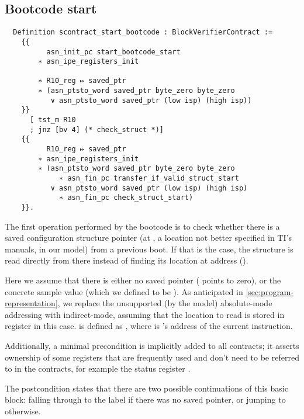 \subsection{Bootcode start}

\begin{verbatim}
  Definition scontract_start_bootcode : BlockVerifierContract :=
    {{
          asn_init_pc start_bootcode_start
        ∗ asn_ipe_registers_init

        ∗ R10_reg ↦ saved_ptr
        ∗ (asn_ptsto_word saved_ptr byte_zero byte_zero
           ∨ asn_ptsto_word saved_ptr (low isp) (high isp))
    }}
      [ tst_m R10
      ; jnz [bv 4] (* check_struct *)]
    {{
          R10_reg ↦ saved_ptr
        ∗ asn_ipe_registers_init
        ∗ (asn_ptsto_word saved_ptr byte_zero byte_zero
             ∗ asn_fin_pc transfer_if_valid_struct_start
           ∨ asn_ptsto_word saved_ptr (low isp) (high isp)
             ∗ asn_fin_pc check_struct_start)
    }}.
\end{verbatim}

The first operation performed by the bootcode is to check whether there is a saved configuration structure pointer (at , a location not better specified in TI's manuals,  in our model) from a previous boot. If that is the case, the structure is read directly from there instead of finding its location at address  ().

Here we assume that there is either no saved pointer ( points to zero), or the concrete sample value  (which we defined to be ). As anticipated in \cref{sec:program-representation}, we replace the unsupported (by the model) absolute-mode addressing with indirect-mode, assuming that the location to read is stored in register  in this case.  is defined as , where  is 's address of the current instruction.

Additionally, a minimal precondition is implicitly added to all contracts; it asserts ownership of some registers that are frequently used and don't need to be referred to in the contracts, for example the status register .

The postcondition states that there are two possible continuations of this basic block: falling through to the  label if there was no  saved pointer, or jumping to  otherwise.

